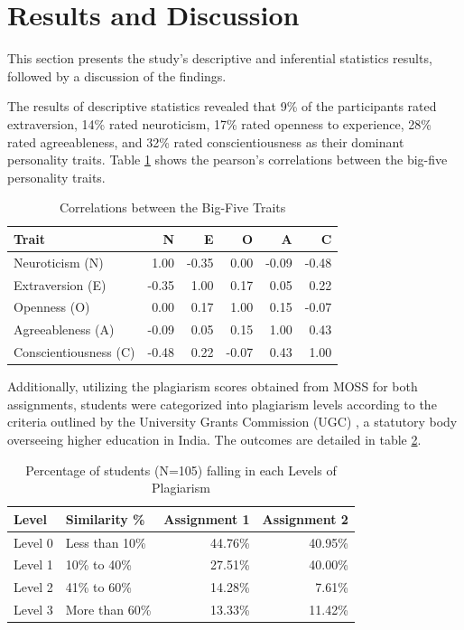 \section{Results and Discussion}
\label{sec:findings}
This section presents the study's descriptive and inferential statistics results, followed by a discussion of the findings.

The results of descriptive statistics revealed that 9\% of the participants rated extraversion, 14\% rated neuroticism, 17\% rated openness to experience, 28\% rated agreeableness, and 32\% rated conscientiousness as their dominant personality traits. Table \ref{tab:correl} shows the pearson's correlations between the big-five personality traits. 

\begin{table}[h]
  \centering
  \caption{Correlations between the Big-Five Traits\label{tab:correl}}
  \vspace{-12pt}
  \begin{tabular}{p{3cm}rrrrr}
    \toprule
    Trait & N & E & O & A & C \\\midrule
    Neuroticism (N) & 1.00 & -0.35 & 0.00 & -0.09 & -0.48 \\
    Extraversion (E) & -0.35 & 1.00 & 0.17 & 0.05 &	0.22 \\
    Openness (O) & 0.00 & 0.17 & 1.00 &	0.15 & -0.07 \\
    Agreeableness (A) & -0.09 &	0.05 & 0.15 & 1.00 & 0.43 \\ 
    Conscientiousness (C) & -0.48 & 0.22 & -0.07 &	0.43 &	1.00  \\\bottomrule
  \end{tabular}\vspace{-8pt}
\end{table}

Additionally, utilizing the plagiarism scores obtained from MOSS for both assignments, students were categorized into plagiarism levels according to the criteria outlined by the University Grants Commission (UGC) \cite{UGCPlagiarism}, a statutory body overseeing higher education in India. The outcomes are detailed in table \ref{tab:levelsPlagiarism}.

\begin{table}[h]
  \centering
  \caption{Percentage of students (N=105) falling in each Levels of Plagiarism \label{tab:levelsPlagiarism}}
  \vspace{-12pt}
  \begin{tabular}{p{1cm}p{2cm}rr}
    \toprule
    Level & Similarity \% & Assignment 1 & Assignment 2 \\\midrule
    Level 0 & Less than 10\% & 44.76\% & 40.95\% \\
    Level 1 & 10\% to 40\% & 27.51\% & 40.00\%  \\
    Level 2 & 41\% to 60\% & 14.28\% & 7.61\% \\
    Level 3 & More than 60\% &13.33\% & 11.42\% \\ \bottomrule
  \end{tabular}\vspace{-8pt}
\end{table}

